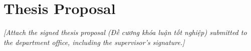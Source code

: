 \chapter*{Thesis Proposal}
\label{proposal}

\textit{[Attach the signed thesis proposal (Đề cương khóa luận tốt nghiệp)
submitted to the department office, including the supervisor's signature.]}
